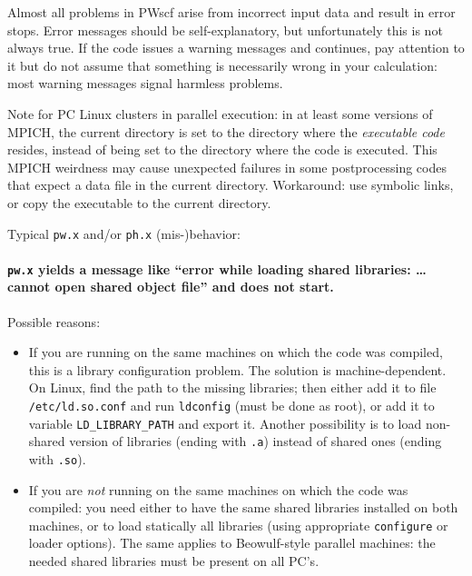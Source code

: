 \documentclass[12pt,a4paper]{article}
\begin{document}
Almost all problems in PWscf arise from incorrect input data and
result in error stops. Error messages should be self-explanatory, 
but unfortunately this is not always true. If the code issues a
warning messages and continues, pay attention to it but do not
assume that something is necessarily wrong in your calculation:
most warning messages signal harmless problems.

Note for PC Linux clusters in parallel execution: in at least some 
versions of MPICH, the current directory is set to the directory where
the \emph{executable code} resides, instead of being set to the
directory where the code is executed.
This MPICH weirdness may cause unexpected failures in some
postprocessing codes that expect a data file
in the current directory.
Workaround: use symbolic links, or copy the executable to the current
directory.

Typical \texttt{pw.x} and/or \texttt{ph.x} (mis-)behavior:

\paragraph{\texttt{pw.x} yields a message like ``error while loading
           shared libraries: \dots{} cannot open shared object file''
           and does not start.}

Possible reasons: 

\begin{itemize}
  \item
    If you are running on the same machines on which the code was
    compiled, this is a library configuration problem.
    The solution is machine-dependent.
    On Linux, find the path to the missing libraries; then either add
    it to file \texttt{/etc/ld.so.conf} and run \texttt{ldconfig}
    (must be done as root), or add it to variable
    \texttt{LD\_LIBRARY\_PATH} and export it.
    Another possibility is to load non-shared version of libraries
    (ending with \texttt{.a}) instead of shared ones (ending with
    \texttt{.so}).
  \item
    If you are \emph{not} running on the same machines on which the
    code was compiled: you need either to have the same shared
    libraries installed on both machines, or to load statically all
    libraries (using appropriate \texttt{configure} or loader options). 
    The same applies to Beowulf-style parallel machines: the needed 
    shared libraries must be present on all PC's.
\end{itemize}
\end{document}
